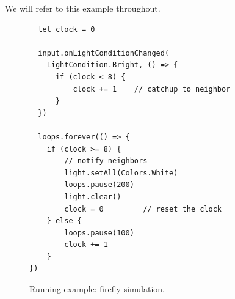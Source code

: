 We will refer to this example throughout.

\begin{figure}
\begin{lstlisting}
  let clock = 0

  input.onLightConditionChanged(
    LightCondition.Bright, () => {
      if (clock < 8) {
          clock += 1    // catchup to neighbor
      }
  })

  loops.forever(() => {
    if (clock >= 8) {
        // notify neighbors
        light.setAll(Colors.White)
        loops.pause(200)
        light.clear()
        clock = 0         // reset the clock
    } else {
        loops.pause(100)
        clock += 1
    }
})
\end{lstlisting}
\caption{\label{fig:example}Running example: firefly simulation.}
\end{figure}

%